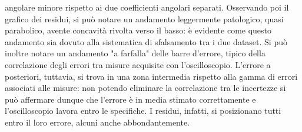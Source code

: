 \documentclass[a4paper,11pt]{article} %
\begin{document}
angolare minore rispetto ai due coefficienti angolari separati. Osservando poi il grafico dei residui, si può notare un
andamento leggermente patologico, quasi parabolico, avente concavità rivolta verso il basso: è evidente come questo
andamento sia dovuto alla sistematica di sfalsamento tra i due dataset. Si può inoltre notare un andamento "a farfalla"
delle barre d'errore, tipico della correlazione degli errori tra misure acquisite con l'oscilloscopio. L'errore a
posteriori, tuttavia, si trova in una zona intermedia rispetto alla gamma di errori associati alle misure: non potendo
eliminare la correlazione tra le incertezze si può affermare dunque che l'errore è in media stimato correttamente e
l'oscilloscopio lavora entro le specifiche. I residui, infatti, si posizionano tutti entro il loro errore, alcuni anche
abbondantemente.\\
\end{document}
